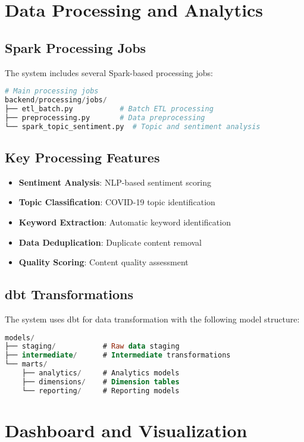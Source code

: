 \documentclass[12pt,a4paper]{article}
\begin{document}
\section{Data Processing and Analytics}

\subsection{Spark Processing Jobs}
The system includes several Spark-based processing jobs:

\begin{lstlisting}[language=python, caption=Spark Job Structure]
# Main processing jobs
backend/processing/jobs/
├── etl_batch.py           # Batch ETL processing
├── preprocessing.py       # Data preprocessing
└── spark_topic_sentiment.py  # Topic and sentiment analysis
\end{lstlisting}

\subsection{Key Processing Features}
\begin{itemize}
    \item \textbf{Sentiment Analysis}: NLP-based sentiment scoring
    \item \textbf{Topic Classification}: COVID-19 topic identification
    \item \textbf{Keyword Extraction}: Automatic keyword identification
    \item \textbf{Data Deduplication}: Duplicate content removal
    \item \textbf{Quality Scoring}: Content quality assessment
\end{itemize}

\subsection{dbt Transformations}
The system uses dbt for data transformation with the following model structure:

\begin{lstlisting}[language=sql, caption=dbt Model Structure]
models/
├── staging/           # Raw data staging
├── intermediate/      # Intermediate transformations
└── marts/
    ├── analytics/     # Analytics models
    ├── dimensions/    # Dimension tables
    └── reporting/     # Reporting models
\end{lstlisting}

\section{Dashboard and Visualization}
\end{document}
